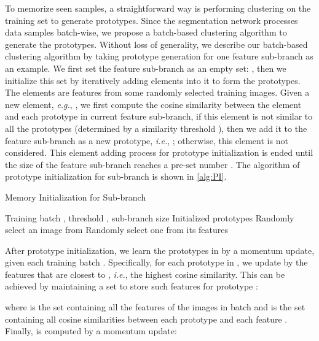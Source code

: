 \documentclass[10pt,twocolumn,letterpaper]{article}
\begin{document}
To memorize seen samples, a straightforward way is performing clustering on the training set to generate prototypes. Since the segmentation network processes data samples batch-wise, we propose a batch-based clustering algorithm to generate the prototypes. Without loss of generality, we describe our batch-based clustering algorithm by taking prototype generation for one feature sub-branch  as an example. We first set the feature sub-branch as an empty set: , then we initialize this set by iteratively adding elements into it to form the prototypes. The elements are features from some randomly selected training images. Given a new element, \emph{e.g.}, , we first compute the cosine similarity  between the element  and each prototype  in current feature sub-branch, if this element is not similar to all the prototypes (determined by a similarity threshold ), then we add it to the feature sub-branch as a new prototype, \emph{i.e.}, ; otherwise, this element is not considered. This element adding process for prototype initialization is ended until the size of the feature sub-branch reaches a pre-set number . The algorithm of prototype initialization for sub-branch  is shown in \cref{alg:PI}.







\begin{algorithm}[t!]
\caption{Memory Initialization for Sub-branch }
\label{alg:PI}
    \begin{algorithmic}[1]
    \REQUIRE Training batch , threshold ,  sub-branch size 
    \ENSURE Initialized  prototypes 
    \STATE 
    \WHILE {}
    \STATE Randomly select an image  from 
    \STATE Randomly select one  from its features
    \IF{}
    \STATE   
    \ENDIF
    \ENDWHILE
    \end{algorithmic}
\end{algorithm}


After prototype initialization, we learn the prototypes in  by a momentum update, given each training batch . Specifically, for each prototype  in , we update  by the features that are closest to , \emph{i.e.}, the highest cosine similarity. This can be achieved by maintaining a set  to store such features for prototype :

where  is the set containing all the features of the images in batch  and   is the set containing all cosine similarities between each prototype  and each feature . Finally,  is computed by a momentum update:
\end{document}
